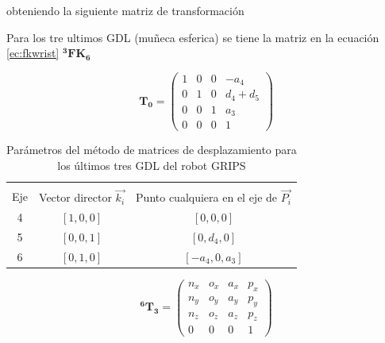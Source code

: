 obteniendo la siguiente matriz de transformación



Para los tre ultimos GDL (muñeca esferica) se tiene la matriz en la ecuación \ref{ec:fkwrist} $\mathbf{^{3}FK_6}$




\begin{equation}
\mathbf{T_0}=\begin{pmatrix}
1 & 0 & 0 & -a_4\\
0 & 1 & 0 & d_4+d_5\\
0 & 0 & 1 & a_3\\
0 & 0 & 0 & 1

\end{pmatrix}
\end{equation}



\begin{table}[htb!]
\centering
\label{tab:l3gdl}
\caption{Parámetros del método de matrices de desplazamiento para los últimos tres GDL del robot GRIPS}
\begin{tabular}{c c c}
\hline \\
Eje & Vector director $\vec{k_i}$ & Punto cualquiera en el eje de $\vec{P_i}$ \\
4				& $[1,0,0] $ &  $[0,0,0]$\\
5				& $[0,0,1] $ &  $[0,d_4,0]$\\
6				& $[0,1,0] $ &  $[-a_4,0,a_3]$\\
\hline
\end{tabular}
\end{table}


\begin{equation}
\label{ec:fkwrist}
\mathbf{^{6}T_3}=\begin{pmatrix}
n_x & o_x & a_x & p_x\\
n_y & o_y & a_y & p_y\\
n_z & o_z & a_z & p_z\\
0   & 0   & 0 & 1
\end{pmatrix}
\end{equation}




